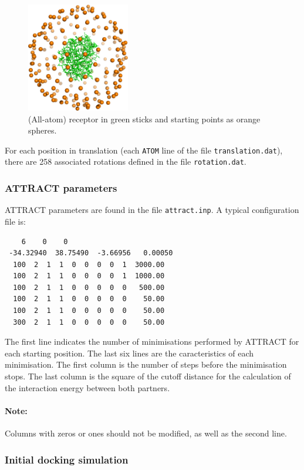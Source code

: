 \documentclass[12pt,a4paper]{article}
\begin{document}
\begin{figure}[htbp]
\center
\includegraphics*[width=0.4\textwidth]{img/1CGI_translation.png}
\caption{(All-atom) receptor in green sticks and starting points as orange spheres.}
\end{figure}

For each position in translation (each {\tt ATOM} line of the file {\tt translation.dat}), 
there are 258 associated rotations defined in the file {\tt rotation.dat}. 

\subsubsection{ATTRACT parameters}

ATTRACT parameters are found in the file {\tt attract.inp}. A typical configuration file is:
\begin{verbatim}
    6    0    0
 -34.32940  38.75490  -3.66956   0.00050
  100  2  1  1  0  0  0  0  1  3000.00   
  100  2  1  1  0  0  0  0  1  1000.00   
  100  2  1  1  0  0  0  0  0   500.00   
  100  2  1  1  0  0  0  0  0    50.00   
  100  2  1  1  0  0  0  0  0    50.00   
  300  2  1  1  0  0  0  0  0    50.00
\end{verbatim}

The first line indicates the number of minimisations performed by ATTRACT
for each starting position.  The last six lines are the caracteristics of
each minimisation. The first column is the number of steps before the
minimisation stops.  The last column is the square of the cutoff distance
for the calculation of the interaction energy between both partners.

\paragraph{Note:} Columns with zeros or ones should not be modified, as
well as the second line.

\subsubsection{Initial docking simulation}
\end{document}
